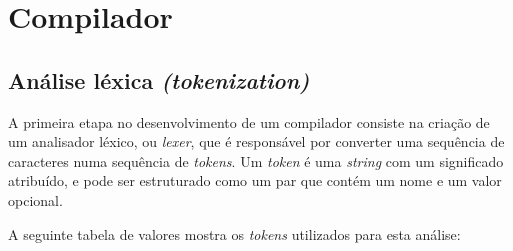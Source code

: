 
\chapter{Compilador} %

\label{Chapter4} %

\section{Análise léxica \textit{(tokenization)}}
A primeira etapa no desenvolvimento de um compilador consiste na criação de um analisador léxico, ou \textit{lexer}, que é responsável por converter uma sequência de caracteres numa sequência de \textit{tokens}.
Um \textit{token} é uma \textit{string} com um significado atribuído, e pode ser estruturado como um par que contém um nome e um valor opcional.

A seguinte tabela de valores mostra os \textit{tokens} utilizados para esta análise:

